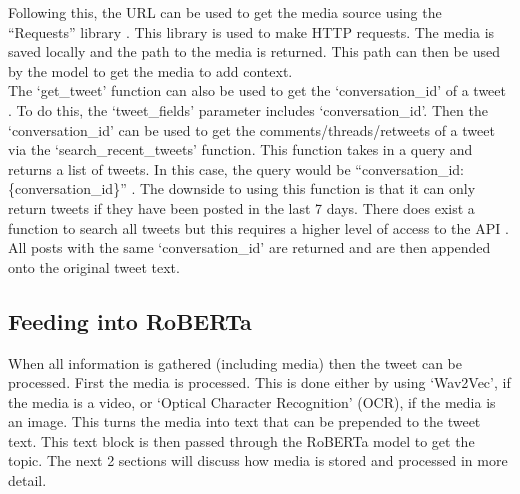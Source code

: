 Following this, the URL can be used to get the media source using the ``Requests'' library \cite{requests}. This library is used to make HTTP requests. The media is saved
locally and the path to the media is returned. This path can then be used by the model to get the media to add context.\\
The `get\_tweet' function can also be used to get the `conversation\_id' of a tweet \cite{tweepy}. To do this, the `tweet\_fields' parameter includes `conversation\_id'.
Then the `conversation\_id' can be used to get the comments/threads/retweets of a tweet via the `search\_recent\_tweets' function. This function takes in
a query and returns a list of tweets. In this case, the query would be ``conversation\_id:\{conversation\_id\}'' \cite{tweepy}. The downside to using this function
is that it can only return tweets if they have been posted in the last 7 days. There does exist a function to search all tweets but this requires
a higher level of access to the API \cite{academic_acc}. All posts with the same `conversation\_id' are returned and are then appended onto the original tweet text.
\subsection{Feeding into RoBERTa}
When all information is gathered (including media) then the tweet can be processed. First the media is processed. This is done either by using
`Wav2Vec', if the media is a video, or `Optical Character Recognition' (OCR), if the media is an image. This turns the media into text that can be
prepended to the tweet text. This text block is then passed through the RoBERTa model to get the topic. The next 2 sections will discuss how
media is stored and processed in more detail.\\
